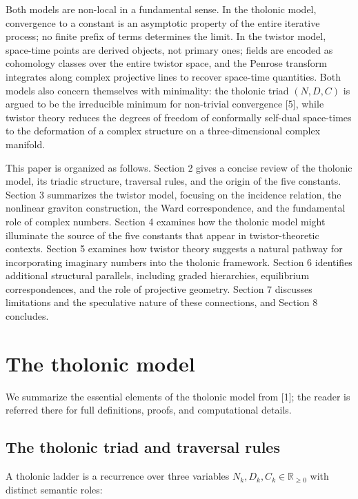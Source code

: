 \documentclass[12pt]{article}
\begin{document}
Both models are non-local in a fundamental sense. In the tholonic model,
convergence to a constant is an asymptotic property of the entire
iterative process; no finite prefix of terms determines the limit. In
the twistor model, space-time points are derived objects, not primary
ones; fields are encoded as cohomology classes over the entire twistor
space, and the Penrose transform integrates along complex projective
lines to recover space-time quantities. Both models also concern
themselves with minimality: the tholonic triad \((N, D, C)\) is argued
to be the irreducible minimum for non-trivial convergence {[}5{]}, while
twistor theory reduces the degrees of freedom of conformally self-dual
space-times to the deformation of a complex structure on a
three-dimensional complex manifold.

This paper is organized as follows. Section 2 gives a concise review of
the tholonic model, its triadic structure, traversal rules, and the
origin of the five constants. Section 3 summarizes the twistor model,
focusing on the incidence relation, the nonlinear graviton construction,
the Ward correspondence, and the fundamental role of complex numbers.
Section 4 examines how the tholonic model might illuminate the source of
the five constants that appear in twistor-theoretic contexts. Section 5
examines how twistor theory suggests a natural pathway for incorporating
imaginary numbers into the tholonic framework. Section 6 identifies
additional structural parallels, including graded hierarchies,
equilibrium correspondences, and the role of projective geometry.
Section 7 discusses limitations and the speculative nature of these
connections, and Section 8 concludes.

\section{The tholonic model}\label{the-tholonic-model}

We summarize the essential elements of the tholonic model from {[}1{]};
the reader is referred there for full definitions, proofs, and
computational details.

\subsection{The tholonic triad and traversal rules}\label{the-tholonic-triad-and-traversal-rules}

A tholonic ladder is a recurrence over three variables
\(N_k, D_k, C_k \in \mathbb{R}_{\geq 0}\) with distinct semantic roles:
\end{document}
